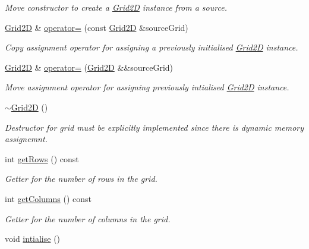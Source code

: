 \begin{DoxyCompactItemize}
\begin{DoxyCompactList}\small\item\em Move constructor to create a \hyperlink{class_grid2_d}{Grid2D} instance from a source. \end{DoxyCompactList}\item 
\hyperlink{class_grid2_d}{Grid2D} \& \hyperlink{class_grid2_d_adff3f6e81d650b093fa6c130c7619a07}{operator=} (const \hyperlink{class_grid2_d}{Grid2D} \&source\+Grid)
\begin{DoxyCompactList}\small\item\em Copy assignment operator for assigning a previously initialised \hyperlink{class_grid2_d}{Grid2D} instance. \end{DoxyCompactList}\item 
\hyperlink{class_grid2_d}{Grid2D} \& \hyperlink{class_grid2_d_a1191e358bbda72eb01035d7284a4982f}{operator=} (\hyperlink{class_grid2_d}{Grid2D} \&\&source\+Grid)
\begin{DoxyCompactList}\small\item\em Move assignment operator for assigning previously intialised \hyperlink{class_grid2_d}{Grid2D} instance. \end{DoxyCompactList}\item 
\mbox{\label{class_grid2_d_a879961842f9cd928dcb66684f1744d35}} 
\hyperlink{class_grid2_d_a879961842f9cd928dcb66684f1744d35}{$\sim$\+Grid2D} ()
\begin{DoxyCompactList}\small\item\em Destructor for grid must be explicitly implemented since there is dynamic memory assignemnt. \end{DoxyCompactList}\item 
int \hyperlink{class_grid2_d_a99b9cf77d65fdf321f0d1dab6720f68c}{get\+Rows} () const
\begin{DoxyCompactList}\small\item\em Getter for the number of rows in the grid. \end{DoxyCompactList}\item 
int \hyperlink{class_grid2_d_a9c938ac6bc35ad0be047b06afb3ba59b}{get\+Columns} () const
\begin{DoxyCompactList}\small\item\em Getter for the number of columns in the grid. \end{DoxyCompactList}\item 
void \hyperlink{class_grid2_d_ae96a92e2933a30a76b3dc22c6c075371}{intialise} ()

\end{DoxyCompactItemize}

